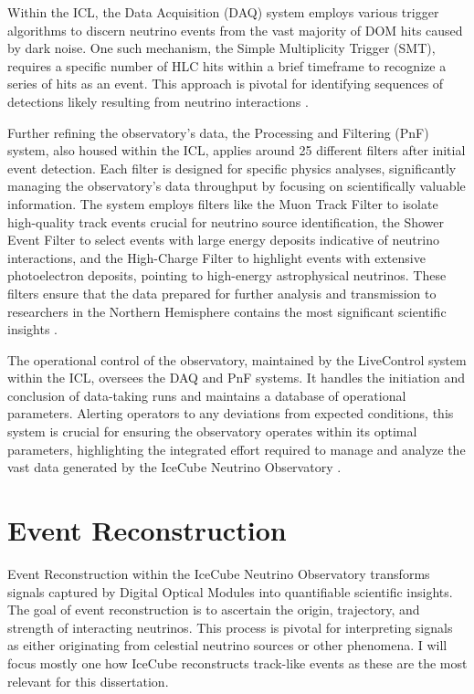 Within the ICL, the Data Acquisition (DAQ) system employs various trigger algorithms to discern neutrino events from the vast majority of DOM hits caused by dark noise.
One such mechanism, the Simple Multiplicity Trigger (SMT), requires a specific number of HLC hits within a brief timeframe to recognize a series of hits as an event.
This approach is pivotal for identifying sequences of detections likely resulting from neutrino interactions \cite{IC3_thedetector}.

Further refining the observatory's data, the Processing and Filtering (PnF) system, also housed within the ICL, applies around 25 different filters after initial event detection.
Each filter is designed for specific physics analyses, significantly managing the observatory's data throughput by focusing on scientifically valuable information.
The system employs filters like the Muon Track Filter to isolate high-quality track events crucial for neutrino source identification, the Shower Event Filter to select events with large energy deposits indicative of neutrino interactions, and the High-Charge Filter to highlight events with extensive photoelectron deposits, pointing to high-energy astrophysical neutrinos.
These filters ensure that the data prepared for further analysis and transmission to researchers in the Northern Hemisphere contains the most significant scientific insights \cite{IC3_thedetector}.

The operational control of the observatory, maintained by the LiveControl system within the ICL, oversees the DAQ and PnF systems.
It handles the initiation and conclusion of data-taking runs and maintains a database of operational parameters.
Alerting operators to any deviations from expected conditions, this system is crucial for ensuring the observatory operates within its optimal parameters, highlighting the integrated effort required to manage and analyze the vast data generated by the IceCube Neutrino Observatory \cite{IC3_thedetector}.

\section{Event Reconstruction}
Event Reconstruction within the IceCube Neutrino Observatory transforms signals captured by Digital Optical Modules into quantifiable scientific insights.
The goal of event reconstruction is to ascertain the origin, trajectory, and strength of interacting neutrinos.
This process is pivotal for interpreting signals as either originating from celestial neutrino sources or other phenomena.
I will focus mostly one how IceCube reconstructs track-like events as these are the most relevant for this dissertation.

